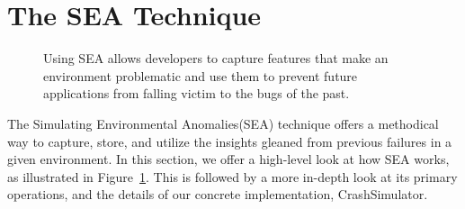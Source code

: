 \section{The SEA Technique}
\label{SEC:approach}

\begin{figure}[t]
  \center{}
  \caption{Using SEA allows developers to capture features that make an
    environment problematic and use them to prevent future applications
    from falling victim to the bugs of the past.}
  \label{figure:approach}
\end{figure}

The Simulating Environmental Anomalies(SEA) technique
offers a methodical way to
capture, store, and utilize the insights gleaned from
previous failures in a given environment.
In this section, we offer a high-level look at how
SEA works, as illustrated in Figure~\ref{figure:approach}.
This is followed by a more in-depth look at its primary operations,
and the details of our concrete implementation, CrashSimulator.

